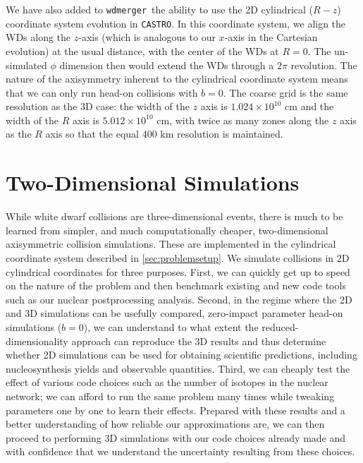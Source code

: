 \documentclass[twocolumn,numberedappendix]{../aastex6}
\newcommand{\castro}{\texttt{CASTRO}}
\newcommand{\wdmerger}{\texttt{wdmerger}}
\begin{document}
We have also added to \wdmerger\ the ability to use the 2D cylindrical ($R-z$)
coordinate system evolution in \castro. In this coordinate system, we align
the WDs along the $z$-axis (which is analogous to our $x$-axis in the Cartesian
evolution) at the usual distance, with the center of the WDs at $R = 0$. The
un-simulated $\phi$ dimension then would extend the WDs through a $2\pi$ revolution.
The nature of the axisymmetry inherent to the cylindrical coordinate system
means that we can only run head-on collisions with $b = 0$. The coarse grid
is the same resolution as the 3D case: the width of the $z$ axis is $1.024 \times 10^{10}$
cm and the width of the $R$ axis is $5.012 \times 10^{10}$ cm, with twice as
many zones along the $z$ axis as the $R$ axis so that the equal 400 km
resolution is maintained.



\section{Two-Dimensional Simulations}
\label{sec:2D}

While white dwarf collisions are three-dimensional events, there is much to
be learned from simpler, and much computationally cheaper, two-dimensional
axisymmetric collision simulations. These are implemented in the cylindrical
coordinate system described in \autoref{sec:problemsetup}.
We simulate collisions in 2D cylindrical coordinates for three purposes.
First, we can quickly get up to speed on the nature of the problem and then
benchmark existing and new code tools such as our nuclear postprocessing analysis.
Second, in the regime where the 2D and 3D simulations can be usefully compared, 
zero-impact parameter head-on simulations ($b = 0$), we can understand to
what extent the reduced-dimensionality approach can reproduce the 3D results
and thus determine whether 2D simulations can be used for obtaining scientific
predictions, including nucleosynthesis yields and observable quantities.
Third, we can cheaply test the effect of various code choices such as the number
of isotopes in the nuclear network; we can afford to run the same problem many
times while tweaking parameters one by one to learn their effects. 
Prepared with these results and a better understanding of how reliable our
approximations are, we can then proceed to performing 3D simulations with
our code choices already made and with confidence that we understand the
uncertainty resulting from these choices.
\end{document}
